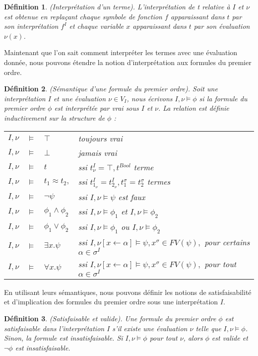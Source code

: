 \documentclass[11pt,openany]{article}
\newtheorem{definition}{D\'efinition}[subsection]
\begin{document}
\begin{definition}
(Interpr\'etation d'un terme). L'interpr\'etation de t relative \`a $I$ et $\nu$ est obtenue en repla\c{c}ant chaque symbole de fonction $f$ apparaissant dans $t$ par son interpr\'etation $f^{I}$ et chaque variable $x$ apparaissant dans $t$ par son \'evaluation $\nu(x)$.
\end{definition}
Maintenant que l'on sait comment interpr\'eter les termes avec une \'evaluation donn\'ee, nous pouvons \'etendre la notion d'interpr\'etation aux formules du premier ordre.
\begin{definition}
(S\'emantique d'une formule du premier ordre). Soit une interpr\'etation $I$ et une \'evaluation $\nu \in V_{I}$, nous \'ecrivons $I,\nu\models\phi$ si la formule du premier ordre $\phi$ est interpr\'et\'ee par vrai sous $I$ et $\nu$. La relation est d\'efinie inductivement sur la structure de $\phi$ :

\begin{tabular}{rcll}
$I,\nu$ & $\models$ & $\top$ & toujours vrai\\
$I,\nu$ & $\models$ & $\bot$ & jamais vrai\\
$I,\nu$ & $\models$ & $t$ & ssi $t^{I}_{\nu}=\top,t^{Bool}$ terme\\
$I,\nu$ & $\models$ & $t_{1}\approx t_{2},$ & ssi $t^{I}_{1_{\nu}}=t^{I}_{2_{\nu}},t^{\sigma}_{1}=t^{\sigma}_{2}$ termes \\
$I,\nu$ & $\models$ & $\neg\psi$ & ssi $I,\nu\models\psi$ est faux\\
$I,\nu$ & $\models$ & $\phi_{1}\land\phi_{2}$ & ssi $I,\nu\models\phi_{1}$ et $I,\nu\models\phi_{2}$\\
$I,\nu$ & $\models$ & $\phi_{1}\lor\phi_{2}$ & ssi $I,\nu\models\phi_{1}$ ou $I,\nu\models\phi_{2}$\\
$I,\nu$ & $\models$ & $\exists x.\psi$ & ssi $I,\nu[x\leftarrow\alpha]\models\psi, x^{\sigma}\in FV(\psi),$ pour certains $\alpha\in\sigma^{I}$\\
$I,\nu$ & $\models$ & $\forall x.\psi$ & ssi $I,\nu[x\leftarrow\alpha]\models\psi, x^{\sigma}\in FV(\psi),$ pour tout $\alpha\in\sigma^{I}$

\end{tabular}
\end{definition}

En utilisant leurs s\'emantiques, nous pouvons d\'efinir les notions de satisfaisabilit\'e  et d'implication des formules du premier ordre sous une interpr\'etation $I$.

\begin{definition}
(Satisfaisable et valide). Une formule du premier ordre $\phi$ est satisfaisable dans l'interpr\'etation $I$ s'il existe une \'evaluation $\nu$ telle que $I,\nu\models\phi$. Sinon, la formule est insatisfaisable. Si $I,\nu\models\phi$ pour tout $\nu$, alors $\phi$ est valide et $\neg\phi$ est insatisfaisable.
\end{definition}
\end{document}

